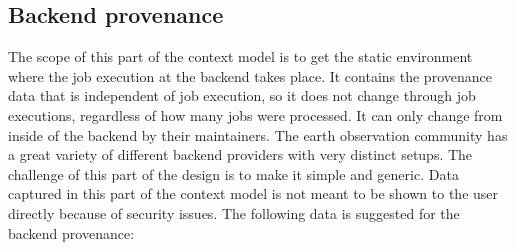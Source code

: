 \documentclass[draft,final]{vutinfth} %
\begin{document}
\subsection{Backend provenance}\label{Design:Backend provenance}
The scope of this part of the context model is to get the static environment where the job execution at the backend takes place. It contains the provenance data that is independent of job execution, so it does not change through job executions, regardless of how many jobs were processed. It can only change from inside of the backend by their maintainers. The earth observation community has a great variety of different backend providers with very distinct setups. The challenge of this part of the design is to make it simple and generic. Data captured in this part of the context model is not meant to be shown to the user directly because of security issues. The following data is suggested for the backend provenance:
\end{document}
